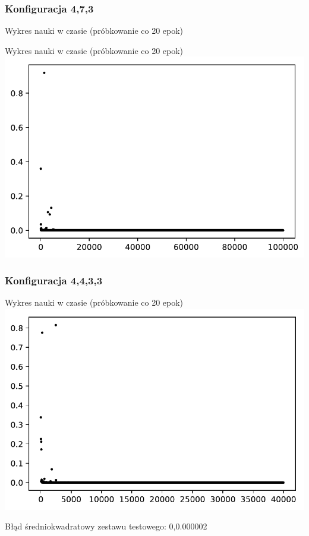 \documentclass{classrep}
\begin{document}
\subsubsection{Konfiguracja 4,7,3}
Wykres nauki w czasie (próbkowanie co 20 epok)
\begin{center}
Wykres nauki w czasie (próbkowanie co 20 epok)
 \includegraphics{output_0_3.pdf}
\end{center}
\subsubsection{Konfiguracja 4,4,3,3}
\begin{center}
Wykres nauki w czasie (próbkowanie co 20 epok)
 \includegraphics{output_0_4.pdf}
\end{center}
Błąd średniokwadratowy zestawu testowego: 0,0.000002
\end{document}
